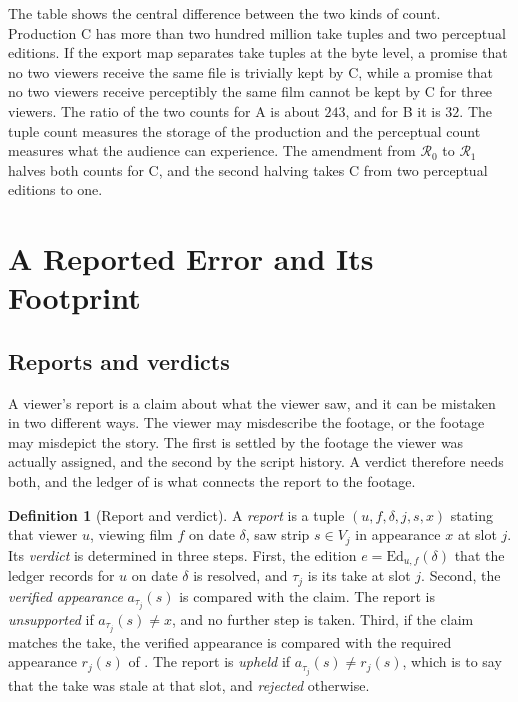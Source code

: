 \documentclass[11pt,twoside,openright]{book}
\theoremstyle{plain}
\theoremstyle{definition}
\newtheorem{definition}[theorem]{Definition}
\theoremstyle{remark}
\begin{document}
The table shows the central difference between the two kinds of count. Production C has more than two hundred million take tuples and two perceptual editions. If the export map separates take tuples at the byte level, a promise that no two viewers receive the same file is trivially kept by C, while a promise that no two viewers receive perceptibly the same film cannot be kept by C for three viewers. The ratio of the two counts for A is about $243$, and for B it is $32$. The tuple count measures the storage of the production and the perceptual count measures what the audience can experience. The amendment from $\mathcal R_0$ to $\mathcal R_1$ halves both counts for C, and the second halving takes C from two perceptual editions to one.

\section{A Reported Error and Its Footprint}\label{sec:error}

\subsection{Reports and verdicts}

A viewer's report is a claim about what the viewer saw, and it can be mistaken in two different ways. The viewer may misdescribe the footage, or the footage may misdepict the story. The first is settled by the footage the viewer was actually assigned, and the second by the script history. A verdict therefore needs both, and the ledger of  is what connects the report to the footage.

\begin{definition}[Report and verdict]\label{def:verdict}
A \emph{report} is a tuple $(u,f,\delta,j,s,x)$ stating that viewer $u$, viewing film $f$ on date $\delta$, saw strip $s\in V_j$ in appearance $x$ at slot $j$. Its \emph{verdict} is determined in three steps. First, the edition $e=\mathrm{Ed}_{u,f}(\delta)$ that the ledger records for $u$ on date $\delta$ is resolved, and $\tau_j$ is its take at slot $j$. Second, the \emph{verified appearance} $a_{\tau_j}(s)$ is compared with the claim. The report is \emph{unsupported} if $a_{\tau_j}(s)\ne x$, and no further step is taken. Third, if the claim matches the take, the verified appearance is compared with the required appearance $r_j(s)$ of . The report is \emph{upheld} if $a_{\tau_j}(s)\ne r_j(s)$, which is to say that the take was stale at that slot, and \emph{rejected} otherwise.
\end{definition}
\end{document}
